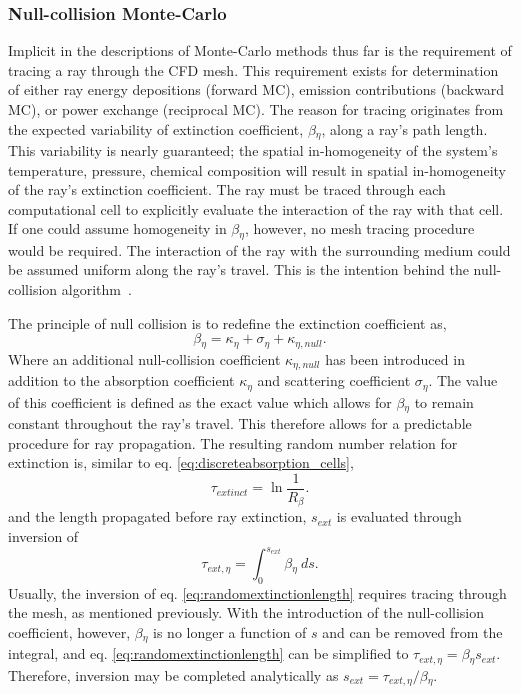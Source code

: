 \subsubsection{Null-collision Monte-Carlo}
Implicit in the descriptions of Monte-Carlo methods thus far is the requirement of tracing a ray through the CFD mesh.
This requirement exists for determination of either ray energy depositions (forward MC), emission contributions (backward MC), or power exchange (reciprocal MC). 
The reason for tracing originates from the expected variability of extinction coefficient, $\beta{}_\eta{}$, along a ray's path length. 
This variability is nearly guaranteed; the spatial in-homogeneity of the system's temperature, pressure, chemical composition will result in spatial in-homogeneity of the ray's extinction coefficient. 
The ray must be traced through each computational cell to explicitly evaluate the interaction of the ray with that cell.
If one could assume homogeneity in $\beta{}_\eta{}$, however, no mesh tracing procedure would be required. The interaction of the ray with the surrounding medium could be assumed uniform along the ray's travel.
This is the intention behind the null-collision algorithm~\cite{Galtier2013IntegralAlgorithms,Eymet2013Null-collisionSimulators}.

The principle of null collision is to redefine the extinction coefficient as,
\begin{equation}
    \beta{}_\eta{} = \kappa{}_\eta{}+\sigma{}_\eta+\kappa{}_{\eta{},null}.
    \label{eq:null_coll_absco}
\end{equation}
Where an additional null-collision coefficient $\kappa{}_{\eta,null}$ has been introduced in addition to the absorption coefficient $\kappa{}_\eta$ and scattering coefficient $\sigma{}_\eta{}$. 
The value of this coefficient is defined as the exact value which allows for $\beta{}_\eta{}$ to remain constant throughout the ray's travel.
This therefore allows for a predictable procedure for ray propagation. The resulting random number relation for extinction is, similar to eq. \ref{eq:discreteabsorption_cells},
\begin{equation}
    \tau_{extinct} = \ln{\frac{1}{R_\beta{}}}.
    \label{eq:discreteabsorption_cells_repeated}
\end{equation}
and the length propagated before ray extinction, $s_{ext}$ is evaluated through inversion of
\begin{equation}
    \tau_{ext,\eta{}} = \int_0^{s_{ext}}{\beta{}_\eta{}~ds}.
    \label{eq:randomextinctionlength}
\end{equation}
Usually, the inversion of eq. \ref{eq:randomextinctionlength} requires tracing through the mesh, as mentioned previously. With the introduction of the null-collision coefficient, however, $\beta{}_\eta{}$ is no longer a function of $s$ and can be removed from the integral, and eq. \ref{eq:randomextinctionlength} can be simplified to $\tau{}_{ext,\eta}=\beta{}_\eta{}s_{ext}$. Therefore, inversion may be completed analytically as $s_{ext}=\tau{}_{ext,\eta}/\beta{}_\eta{}$.

